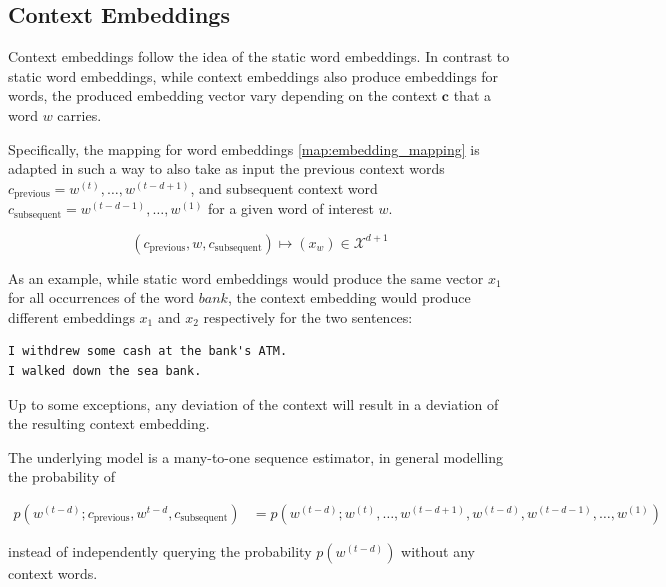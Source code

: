 \documentclass[a4paper,12pt,twoside,openright]{report}
\begin{document}
\newpage
\subsection{Context Embeddings}

Context embeddings follow the idea of the static word embeddings.
In contrast to static word embeddings, while context embeddings also produce embeddings for words, the produced embedding vector vary depending on the context $\mathbf{c}$ that a word $w$ carries.

Specifically, the mapping for word embeddings \eqref{map:embedding_mapping} is adapted in such a way to also take as input the previous context words $c_\text{previous} = w^{(t)}, \ldots, w^{(t-d + 1)}$, and subsequent context word $c_\text{subsequent} = w^{(t-d - 1)}, \ldots, w^{(1)}$ for a given word of interest $w$.

\begin{equation}
(c_\text{previous}, w, c_\text{subsequent}) \mapsto (x_w) \in \mathcal{X}^{d + 1}
\end{equation}{\label{map:context_embedding_mapping}}

As an example, while static word embeddings would produce the same vector $x_1$ for all occurrences of the word $bank$, the context embedding would produce different embeddings $x_1$ and $x_2$ respectively for the two sentences:

\begin{verbatim}
I withdrew some cash at the bank's ATM.
I walked down the sea bank.
\end{verbatim}

Up to some exceptions, any deviation of the context will result in a deviation of the resulting context embedding.


The underlying model is a many-to-one sequence estimator, in general modelling the probability of 

\begin{align}
p(w^{(t-d)}; c_\text{previous}, w^{t-d}, c_\text{subsequent}) &= p(w^{(t-d)}; w^{(t)}, \ldots, w^{(t-d + 1)}, w^{(t-d)}, w^{(t-d - 1)}, \ldots, w^{(1)})
\end{align}{\label{eq:transformer_probability}}

instead of independently querying the probability $p(w^{(t-d)})$ without any context words.
\end{document}
